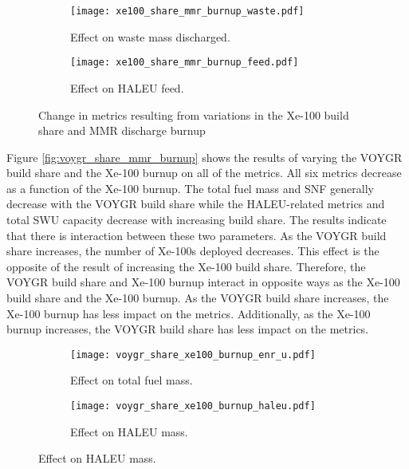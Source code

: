 \begin{figure}
    \ContinuedFloat    
    \begin{subfigure}[t]{0.48\textwidth}
        \centering
        \texttt{[image: xe100\_share\_mmr\_burnup\_waste.pdf]}
        \caption{Effect on waste mass discharged.}
        \label{fig:xe100_share_mmr_burnup_waste}
    \end{subfigure}
    \hfill
    \begin{subfigure}[t]{0.48\textwidth}
        \centering
        \texttt{[image: xe100\_share\_mmr\_burnup\_feed.pdf]}
        \caption{Effect on HALEU feed.}
        \label{fig:xe100_share_mmr_burnup_feed}
    \end{subfigure}
    \caption{Change in metrics resulting from variations in the 
    Xe-100 build share and MMR discharge burnup}
    \label{fig:xe100_share_mmr_burnup}
\end{figure}

Figure \ref{fig:voygr_share_mmr_burnup} shows the results of varying the 
VOYGR build share and the Xe-100 burnup on all of the metrics. All six 
metrics decrease as a function of the Xe-100 burnup. The total fuel 
mass and \gls{SNF} generally decrease with the VOYGR build share while 
the \gls{HALEU}-related metrics and total \gls{SWU} capacity decrease 
with increasing build share. The results indicate that there is interaction 
between these two parameters. As the VOYGR build share increases, the number 
of Xe-100s deployed decreases. This effect is the opposite of the result of 
increasing the Xe-100 build share. Therefore, the VOYGR build share and 
Xe-100 burnup interact in opposite ways as the Xe-100 build share and the 
Xe-100 burnup. As the VOYGR build share increases, the Xe-100 burnup has less impact on the 
metrics. Additionally, as the Xe-100 burnup increases, the VOYGR 
build share has less impact on the metrics. 

\begin{figure}
    \begin{subfigure}[t]{0.48\textwidth}
        \centering
        \texttt{[image: voygr\_share\_xe100\_burnup\_enr\_u.pdf]}
        \caption{Effect on total fuel mass.}
        \label{fig:voygr_share_xe100_burnup_enr_u}
    \end{subfigure}
    \hfill
    \begin{subfigure}[t]{0.48\textwidth}
        \centering
        \texttt{[image: voygr\_share\_xe100\_burnup\_haleu.pdf]}
        \caption{Effect on HALEU mass.}
        \label{fig:voygr_share_xe100_burnup_haleu}
    \end{subfigure}
\end{figure}

